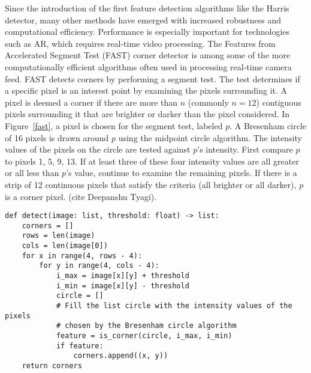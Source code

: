 Since the introduction of the first feature detection algorithms like the Harris detector, many other methods have emerged with increased robustness and computational efficiency. Performance is especially important for technologies such as AR, which requires real-time video processing. The Features from Accelerated Segment Test (FAST) corner detector is among some of the more computationally efficient algorithms often used in processing real-time camera feed. FAST detects corners by performing a segment test. The test determines if a specific pixel is an interest point by examining the pixels surrounding it. A pixel is deemed a corner if there are more than $n$ (commonly $n = 12$) contiguous pixels surrounding it that are brighter or darker than the pixel considered. In Figure~\ref{fast}, a pixel is chosen for the segment test, labeled $p$. A Bresenham circle of 16 pixels is drawn around $p$ using the midpoint circle algorithm. The intensity values of the pixels on the circle are tested against $p$'s intensity. First compare $p$ to pixels 1, 5, 9, 13.  If at least three of these four intensity values are all greater or all less than $p$'s value, continue to examine the remaining pixels. If there is a strip of 12 continuous pixels that satisfy the criteria (all brighter or all darker), $p$ is a corner pixel. (cite Deepanshu Tyagi).

\begin{figure}[!ht]
\end{figure}

\begin{singlespace}
\begin{lstlisting}[mathescape, caption= Check for corner at pixel with given Bresenham circle, label=detect]
def detect(image: list, threshold: float) -> list:
    corners = []
    rows = len(image)
    cols = len(image[0])
    for x in range(4, rows - 4):
        for y in range(4, cols - 4):
            i_max = image[x][y] + threshold
            i_min = image[x][y] - threshold
            circle = []
            # Fill the list circle with the intensity values of the pixels
            # chosen by the Bresenham circle algorithm
            feature = is_corner(circle, i_max, i_min)
            if feature:
                corners.append((x, y))
    return corners
\end{lstlisting}
\end{singlespace}

